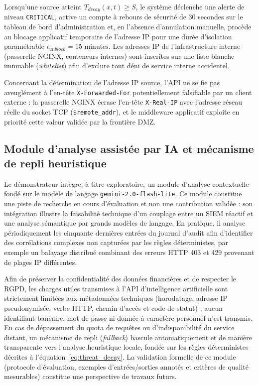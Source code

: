 Lorsqu'une source atteint $T_{decay}(x, t) \ge S$, le système déclenche une alerte de niveau \texttt{CRITICAL}, active un compte à rebours de sécurité de 30 secondes sur le tableau de bord d'administration et, en l'absence d'annulation manuelle, procède au blocage applicatif temporaire de l'adresse IP pour une durée d'isolation paramétrable $t_{unblock} = 15\text{ minutes}$. Les adresses IP de l'infrastructure interne (passerelle NGINX, conteneurs internes) sont inscrites sur une liste blanche immuable (\textit{whitelist}) afin d'exclure tout déni de service interne accidentel.

Concernant la détermination de l'adresse IP source, l'API ne se fie pas aveuglément à l'en-tête \texttt{X-Forwarded-For} potentiellement falsifiable par un client externe : la passerelle NGINX écrase l'en-tête \texttt{X-Real-IP} avec l'adresse réseau réelle du socket TCP (\texttt{\$remote\_addr}), et le middleware applicatif exploite en priorité cette valeur validée par la frontière DMZ.

\subsection{Module d'analyse assistée par IA et mécanisme de repli heuristique}
Le démonstrateur intègre, à titre exploratoire, un module d'analyse contextuelle fondé sur le modèle de langage \texttt{gemini-2.0-flash-lite}. Ce module constitue une piste de recherche en cours d'évaluation et non une contribution validée : son intégration illustre la faisabilité technique d'un couplage entre un SIEM réactif et une analyse sémantique par grands modèles de langage. En pratique, il analyse périodiquement les cinquante dernières entrées du journal d'audit afin d'identifier des corrélations complexes non capturées par les règles déterministes, par exemple un balayage distribué combinant des erreurs HTTP 403 et 429 provenant de plages IP différentes.

Afin de préserver la confidentialité des données financières et de respecter le RGPD, les charges utiles transmises à l'API d'intelligence artificielle sont strictement limitées aux métadonnées techniques (horodatage, adresse IP pseudonymisée, verbe HTTP, chemin d'accès et code de statut) ; aucun identifiant bancaire, mot de passe ni donnée à caractère personnel n'est transmis. En cas de dépassement du quota de requêtes ou d'indisponibilité du service distant, un mécanisme de repli (\textit{fallback}) bascule automatiquement et de manière transparente vers l'analyse heuristique locale, fondée sur les règles déterministes décrites à l'équation~\ref{eq:threat_decay}. La validation formelle de ce module (protocole d'évaluation, exemples d'entrées/sorties annotés et critères de qualité mesurables) constitue une perspective de travaux futurs.

